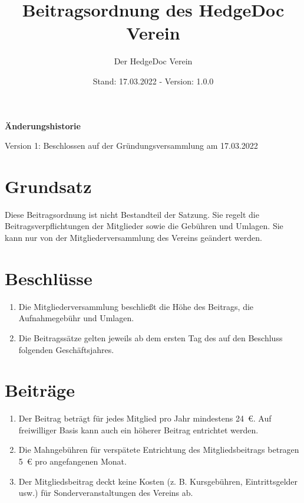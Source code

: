 \documentclass[12pt,paper=a4,ngerman]{scrreprt}
\author{Der HedgeDoc Verein}
\title{Beitragsordnung des HedgeDoc Verein}
\date{Stand: 17.03.2022 - Version: 1.0.0}
\begin{document}
	\maketitle
	
	\textbf{Änderungshistorie}
	\begin{description}
		\item
			Version 1: Beschlossen auf der Gründungsversammlung am 17.03.2022
	\end{description}
	\newpage
	
	\section{Grundsatz}
    	Diese Beitragsordnung ist nicht Bestandteil der Satzung. Sie regelt die Beitragsverpflichtungen der Mitglieder sowie die Gebühren und Umlagen. Sie kann nur von der Mitgliederversammlung des Vereins geändert werden.
	
	\section{Beschlüsse}
	\begin{enumerate}
	    \item
    	    Die Mitgliederversammlung beschließt die Höhe des Beitrags, die Aufnahmegebühr und Umlagen.
        \item 
    	    Die Beitragssätze gelten jeweils ab dem ersten Tag des auf den Beschluss folgenden Geschäftsjahres.
    \end{enumerate}
    	    
    \section{Beiträge}
    \begin{enumerate}
        \item
            Der Beitrag beträgt für jedes Mitglied pro Jahr mindestens 24 €. Auf freiwilliger Basis kann auch ein höherer Beitrag entrichtet werden.
        \item
            \label{sec:beiträge:mahngebühren}
            Die Mahngebühren für verspätete Entrichtung des Mitgliedsbeitrags betragen 5 € pro angefangenen Monat.
        \item
            Der Mitgliedsbeitrag deckt keine Kosten (z. B. Kursgebühren, Eintrittsgelder usw.) für Sonderveranstaltungen des Vereins ab.
    \end{enumerate}
    	    
\end{document}
